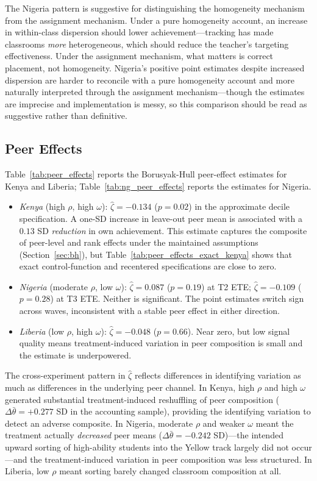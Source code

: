 \documentclass[11pt]{article}
\begin{document}
The Nigeria pattern is suggestive for distinguishing the homogeneity mechanism from the assignment mechanism. Under a pure homogeneity account, an increase in within-class dispersion should lower achievement---tracking has made classrooms \emph{more} heterogeneous, which should reduce the teacher's targeting effectiveness. Under the assignment mechanism, what matters is correct placement, not homogeneity. Nigeria's positive point estimates despite increased dispersion are harder to reconcile with a pure homogeneity account and more naturally interpreted through the assignment mechanism---though the estimates are imprecise and implementation is messy, so this comparison should be read as suggestive rather than definitive.

\subsection{Peer Effects}

Table~\ref{tab:peer_effects} reports the Borusyak-Hull peer-effect estimates for Kenya and Liberia; Table~\ref{tab:ng_peer_effects} reports the estimates for Nigeria.

\begin{itemize}
\item \emph{Kenya} (high $\rho$, high $\omega$): $\hat{\zeta} = -0.134$ ($p = 0.02$) in the approximate decile specification. A one-SD increase in leave-out peer mean is associated with a $0.13$ SD \emph{reduction} in own achievement. This estimate captures the composite of peer-level and rank effects under the maintained assumptions (Section~\ref{sec:bh}), but Table~\ref{tab:peer_effects_exact_kenya} shows that exact control-function and recentered specifications are close to zero.

\item \emph{Nigeria} (moderate $\rho$, low $\omega$): $\hat{\zeta} = 0.087$ ($p = 0.19$) at T2 ETE; $\hat{\zeta} = -0.109$ ($p = 0.28$) at T3 ETE. Neither is significant. The point estimates switch sign across waves, inconsistent with a stable peer effect in either direction.

\item \emph{Liberia} (low $\rho$, high $\omega$): $\hat{\zeta} = -0.048$ ($p = 0.66$). Near zero, but low signal quality means treatment-induced variation in peer composition is small and the estimate is underpowered.
\end{itemize}

The cross-experiment pattern in $\hat{\zeta}$ reflects differences in identifying variation as much as differences in the underlying peer channel. In Kenya, high $\rho$ and high $\omega$ generated substantial treatment-induced reshuffling of peer composition ($\Delta\bar{\theta} = +0.277$ SD in the accounting sample), providing the identifying variation to detect an adverse composite. In Nigeria, moderate $\rho$ and weaker $\omega$ meant the treatment actually \emph{decreased} peer means ($\Delta\bar{\theta} = -0.242$ SD)---the intended upward sorting of high-ability students into the Yellow track largely did not occur---and the treatment-induced variation in peer composition was less structured. In Liberia, low $\rho$ meant sorting barely changed classroom composition at all.
\end{document}
